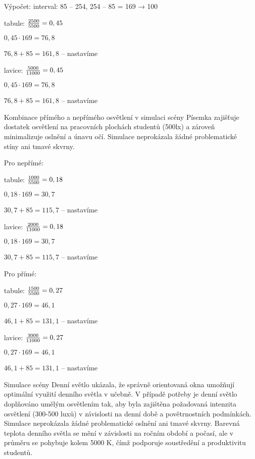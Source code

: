 Výpočet: interval: 85 – 254, 254 – 85 = 169 → 100 \pcent

tabule: ${2500 \over 5500} = 0,45$

        ${0,45 \cdot 169} = 76,8$

        $76,8 + 85 = 161,8$ – nastavíme

lavice: ${5000 \over 11000} = 0,45$

        ${0,45 \cdot 169} = 76,8$

        $76,8 + 85 = 161,8$ – nastavíme


Kombinace přímého a nepřímého osvětlení v simulaci scény Písemka zajišťuje dostatek osvětlení na pracovních plochách studentů
(500lx) a zároveň minimalizuje oslnění a únavu očí.
Simulace neprokázala žádné problematické stíny ani tmavé skvrny.

Pro nepřímé:

tabule: ${1000 \over 5500} = 0,18$

        ${0,18 \cdot 169} = 30,7$

        $30,7 + 85 = 115,7$ – nastavíme

lavice: ${2000 \over 11000} = 0,18$

        ${0,18 \cdot 169} = 30,7$

        $30,7 + 85 = 115,7$ – nastavíme

Pro přímé:

tabule: ${1500 \over 5500} = 0,27$

        ${0,27 \cdot 169} = 46,1$

        $46,1 + 85 = 131,1$ – nastavíme

lavice: ${3000 \over 11000} = 0,27$

        ${0,27 \cdot 169} = 46,1$

        $46,1 + 85 = 131,1$ – nastavíme


Simulace scény Denní světlo ukázala, že správně orientovaná okna umožňují optimální využití denního
světla v učebně. V případě potřeby je denní světlo doplňováno umělým osvětlením tak, aby byla zajištěna požadovaná
intenzita osvětlení (300-500 luxů) v závislosti na denní době a povětrnostních podmínkách. Simulace neprokázala žádné
problematické oslnění ani tmavé skvrny. Barevná teplota denního světla se mění v závislosti na ročním období a počasí,
ale v průměru se pohybuje kolem 5000 K, čímž podporuje soustředění a produktivitu studentů.

